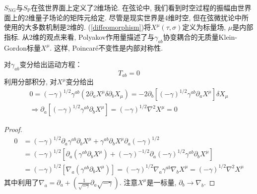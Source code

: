 $S_{\mathrm{NG}}$与$S_{\mathrm{P}}$在弦世界面上定义了2维场论. 在弦论中, 我们看到时空过程的振幅由世界面上的2维量子场论的矩阵元给定. 尽管是现实世界是4维时空, 但在弦微扰论中所使用的大多数机制是2维的. (\ref{diffeomorphism})将$X^\mu(\tau,\sigma)$定义为标量场, $\mu$是内部指标. 从2维的观点来看, Polyakov作用量描述了与$\gamma_{ab}$协变耦合的无质量Klein-Gordon标量$X^\mu$. 这样, Poincar\'{e}不变性是内部对称性. 

对$\gamma_{ab}$变分给出运动方程：
\begin{equation}
T_{ab}=0
\end{equation}
利用分部积分, 对$X^\mu$变分给出
\begin{gather}
0=(-\gamma)^{1/2}\gamma^{ab}(2\partial_a X^\mu\delta\partial_b X_\mu)
=-2\partial_b[(-\gamma)^{1/2}\gamma^{ab}\partial_a X^\mu]\delta X_\mu \nonumber \\
\Longrightarrow\partial_a[(-\gamma)^{1/2}\gamma^{ab}\partial_b X^\mu]=(-\gamma)^{1/2}\nabla^2 X^\mu=0
\end{gather}
\begin{tcolorbox}
    \begin{proof}
        \begin{align}
            0&=(-\gamma)^{1/2}\partial_a \gamma^{ab}\partial_b X^\mu +\gamma^{ab}\partial_b X^\mu \partial_a(-\gamma)^{1/2} \nonumber \\
            &=(-\gamma)^{1/2}[\partial_a (\gamma^{ab}\partial_b X^\mu )+(-\gamma)^{-1/2}\partial_a(-\gamma)^{1/2}\gamma^{ab}\partial_b X^\mu ] \nonumber \\
            &=(-\gamma)^{1/2}[\nabla_a (\gamma^{ab}\partial_b X^\mu )]=(-\gamma)^{1/2}\nabla_a \gamma^{ab}\nabla_b X^\mu =(-\gamma)^{1/2}\nabla^2 X^\mu \nonumber
            \end{align}
            其中利用了$\nabla_a=\partial_a+(\frac{1}{\sqrt{-\gamma}}\partial_a\sqrt{-\gamma})$.
            注意$X^\mu$是一标量, $\partial_b\rightarrow \nabla_b$.
        \end{proof} 
\end{tcolorbox}

